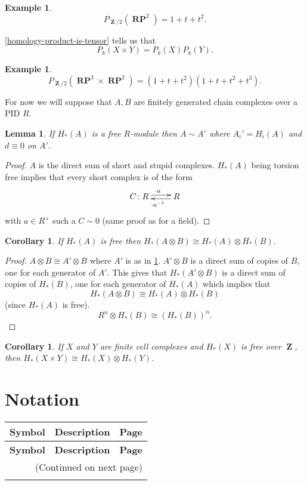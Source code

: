 \documentclass[10pt,]{book}
\theoremstyle{plain}
\newtheorem{corollary}[theorem]{Corollary}
\newtheorem{lemma}[theorem]{Lemma}
\theoremstyle{definition}
\newtheorem{example}[theorem]{Example}
\numberwithin{equation}{section}
\DeclareMathOperator{\ZZ}{\mathbf{Z}}
\DeclareMathOperator{\RP}{\mathbf{RP}}
\begin{document}
\begin{example}\label{example-24}
\[P_{\ZZ/2} (\RP^2) = 1 + t + t^2.\]\end{example}
\par
\ref{homology-product-is-tensor} tells us that \[P_k(X\times Y) = P_k(X)P_k(Y).\]%
\begin{example}\label{example-25}
\[P_{\ZZ/2}(\RP^3 \times \RP^2) = (1+t+t^2)(1+t+t^2+t^3).\]\end{example}
\par
For now we will suppose that \(A,B\) are finitely generated chain complexes over a PID \(R\).%
\begin{lemma}\label{free-homology-homotopic-zero-boundary}
If \(H_*(A)\) is a free \(R\)-module then \(A\sim A'\) where \(A_i' = H_i(A)\) and \(d\equiv 0\) on \(A'\).
          \end{lemma}
\begin{proof}
\(A\) is the direct sum of short and stupid complexes. \(H_*(A)\) being torsion free implies that every short complex is of the form
            \[
              \xymatrix{ C\colon R\ar@<.5ex>[r]^{\cdot a} & R \ar@<.5ex>[l]^{\cdot a^{-1}}}
            \]
            with \(a\in R^\times\) such a \(C \sim 0\) (same proof as for a field).
          \end{proof}
\begin{corollary}\label{corollary-8}
If \(H_*(A)\) is free then \(H_*(A\otimes B) \cong H_*(A) \otimes H_*(B)\).\end{corollary}
\begin{proof}
\(A\otimes B \cong A' \otimes B\) where \(A'\) is as in \ref{free-homology-homotopic-zero-boundary}.
            \(A'\otimes B\) is a direct sum of copies of \(B\), one for each generator of \(A'\).
            This gives that \(H_*(A'\otimes B)\) is  a direct sum of copies of \(H_*(B)\), one for each generator of \(H_*(A)\) which implies that
            \[H_*(A\otimes B) \cong H_*(A) \otimes H_*(B)\]
            (since \(H_*(A)\) is free).
            \[R^n \otimes H_*(B) \cong (H_*(B))^n.\]\end{proof}
\begin{corollary}\label{corollary-9}
If \(X\) and \(Y\) are finite cell complexes and \(H_*(X)\) is free over \(\ZZ\), then \(H_*(X\times Y) \cong H_*(X) \otimes H_*(Y)\).\end{corollary}
%
\backmatter
%
\typeout{************************************************}
\typeout{************************************************}
\section[Notation]{Notation}\label{section-11}
\begin{longtable}[l]{llr}
\textbf{Symbol}&\textbf{Description}&\textbf{Page}\\[1em]
\endfirsthead
\textbf{Symbol}&\textbf{Description}&\textbf{Page}\\[1em]
\endhead
\multicolumn{3}{r}{(Continued on next page)}\\
\endfoot
\endlastfoot
$$&&\pageref{notation-1}\\
\end{longtable}
\end{document}

